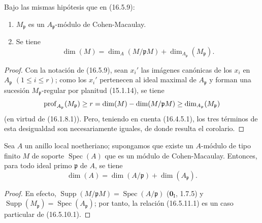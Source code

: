 \begin{corollary}[16.5.10]
\label{0.16.5.10-fr}
Bajo las mismas hipótesis que en \textup{(16.5.9)}:
\begin{enumerate}
  \item[\textup{(i)}] $M_{\mathfrak{p}}$ es un $A_{\mathfrak{p}}$-módulo de
  Cohen-Macaulay.
  \item[\textup{(ii)}] Se tiene
  \begin{equation}
  \label{0.16.5.10.1-fr}
  \tag{16.5.10.1}
    \dim(M)=\dim_A(M/\mathfrak{p}M)
    +\dim_{A_{\mathfrak{p}}}(M_{\mathfrak{p}}).
  \end{equation}
\end{enumerate}
\end{corollary}

\begin{proof}
Con la notación de (16.5.9), sean $x_i'$ las imágenes canónicas de los $x_i$
en $A_{\mathfrak{p}}$ $(1\leq i\leq r)$; como los $x_i'$ pertenecen al
ideal maximal de $A_{\mathfrak{p}}$ y forman una sucesión
$M_{\mathfrak{p}}$-regular por planitud (15.1.14), se tiene
\[
  \operatorname{prof}_{A_{\mathfrak{p}}}(M_{\mathfrak{p}})
  \geq r=\dim(M)-\dim(M/\mathfrak{p}M)
  \geq\dim_{A_{\mathfrak{p}}}(M_{\mathfrak{p}})
\]
(en virtud de (16.1.8.1)). Pero, teniendo en cuenta (16.4.5.1), los tres
términos de esta desigualdad son necesariamente iguales, de donde resulta el corolario.
\end{proof}


\begin{corollary}[16.5.11]
\label{0.16.5.11-fr}
Sea $A$ un anillo local noetheriano; supongamos que existe un $A$-módulo de
tipo finito $M$ de soporte $\operatorname{Spec}(A)$ que es un módulo de
Cohen-Macaulay. Entonces, para todo ideal primo $\mathfrak{p}$ de $A$, se tiene
\begin{equation}
\label{0.16.5.11.1-fr}
\tag{16.5.11.1}
  \dim(A)=\dim(A/\mathfrak{p})+\dim(A_{\mathfrak{p}}).
\end{equation}
\end{corollary}

\begin{proof}
En efecto, $\operatorname{Supp}(M/\mathfrak{p}M)
=\operatorname{Spec}(A/\mathfrak{p})$ ($\mathbf{0}_{\mathrm I}$, 1.7.5) y
$\operatorname{Supp}(M_{\mathfrak{p}})
=\operatorname{Spec}(A_{\mathfrak{p}})$; por tanto, la relación (16.5.11.1) es un
caso particular de (16.5.10.1).
\end{proof}

